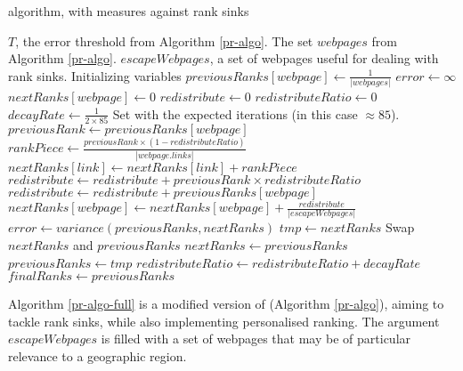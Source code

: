 \begin{algorithm}
\end{algorithm}
\begin{algorithm}
    \caption{\pr{} algorithm, with measures against rank sinks}\label{pr-algo-full}
    \begin{algorithmic}[1]
    \Require $T$, the error threshold from Algorithm \ref{pr-algo}.
    \Require The set $webpages$ from Algorithm \ref{pr-algo}.
    \Require $escapeWebpages$, a set of webpages
        useful for dealing with rank sinks.
    \Comment Initializing variables
        \State $previousRanks[webpage] \gets \frac{1}{|webpages|}$
    \EndFor
    \State $error \gets \infty$\;
    \label{loop}
            \State $nextRanks[webpage] \gets 0$
        \EndFor
        \State $redistribute \gets 0$
        \State $redistributeRatio \gets 0$
        \State $decayRate \gets \frac{1}{2 \times 85}$
        \Comment Set with the expected iterations (in this case $\approx 85$).
            \State $previousRank \gets previousRanks[webpage]$
                \State $rankPiece \gets \frac{previousRank \times (1 - redistributeRatio)}{|webpage.links|}$
                    \State $nextRanks[link] \gets nextRanks[link] + rankPiece$
                \EndFor
                \State $redistribute \gets redistribute + previousRank \times redistributeRatio$
            \Else
                \State $redistribute \gets redistribute + previousRanks[webpage]$
            \EndIf
        \EndFor
            \State $nextRanks[webpage] \gets nextRanks[webpage] + \frac{redistribute}{|escapeWebpages|}$
        \EndFor
        \State $error \gets variance(previousRanks, nextRanks)$
        \State $tmp \gets nextRanks$
        \Comment Swap $nextRanks$ and $previousRanks$
        \State $nextRanks \gets previousRanks$
        \State $previousRanks \gets tmp$
        \State $redistributeRatio \gets redistributeRatio + decayRate$
    \EndWhile
    \State $finalRanks \gets previousRanks$
    \end{algorithmic}
\end{algorithm}

Algorithm \ref{pr-algo-full} is a modified version of \pr{} (Algorithm
\ref{pr-algo}), aiming to tackle rank sinks, while also implementing
personalised ranking.  The argument $escapeWebpages$ is filled with
a set of webpages that may be of particular relevance to a geographic
region.